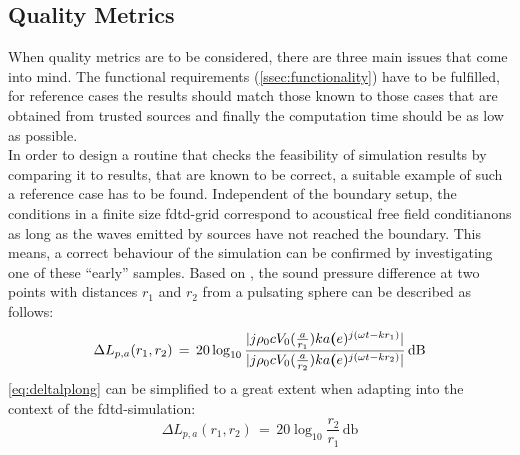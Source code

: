 \subsection{Quality Metrics}\label{ssec:qmetrics}
When quality metrics are to be considered, there are three main issues that come into mind. The functional requirements (\autoref{ssec:functionality}) have to be fulfilled, for reference cases the results should match those known to those cases that are obtained from trusted sources and finally the computation time should be as low as possible.\\
In order to design a routine that checks the feasibility of simulation results by comparing it to results, that are known to be correct, a suitable example of such a reference case has to be found. Independent of the boundary setup, the conditions in a finite size \gls{fdtd}-grid correspond to acoustical free field conditianons as long as the waves emitted by sources have not reached the boundary. This means, a correct behaviour of the simulation can be confirmed by investigating one of these ``early'' samples. Based on \citep[p. 172]{kinsler2000}, the sound pressure difference at two points with distances $r_1$ and $r_2$ from a pulsating sphere can be described as follows:
\begin{equation}\label{eq:deltalplong}
\Delta L_{p,a}(r_1,r_2)\,=\,20\log_{10}\frac{|j\rho_0 c V_0(\frac{a}{r_1})ka \textbf(e)^{j(\omega t-kr_1)}|}{|j\rho_0 c V_0(\frac{a}{r_2})ka \textbf(e)^{j(\omega t-kr_2)}|}\,\si{\decibel}
\end{equation}
\startexplain
{}
\stopexplain
\autoref{eq:deltalplong} can be simplified to a great extent when adapting into the context of the \gls{fdtd}-simulation:
\begin{equation}\label{eq:deltalpshort}
\Delta L_{p,a}(r_1,r_2)\,=\,20\log_{10}\frac{r_2}{r_1}\,\si{\decibel}
\end{equation}
